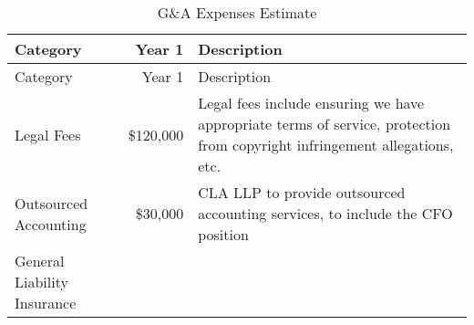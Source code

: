 \documentclass[10pt,openany]{book}
\begin{document}
\begin{longtable}[]{@{}lrl@{}}
\caption{G\&A Expenses Estimate}\tabularnewline
\toprule
\begin{minipage}[b]{0.31\columnwidth}\raggedright
Category\strut
\end{minipage} & \begin{minipage}[b]{0.12\columnwidth}\raggedleft
Year 1\strut
\end{minipage} & \begin{minipage}[b]{0.48\columnwidth}\raggedright
Description\strut
\end{minipage}\tabularnewline
\midrule
\endfirsthead
\toprule
\begin{minipage}[b]{0.31\columnwidth}\raggedright
Category\strut
\end{minipage} & \begin{minipage}[b]{0.12\columnwidth}\raggedleft
Year 1\strut
\end{minipage} & \begin{minipage}[b]{0.48\columnwidth}\raggedright
Description\strut
\end{minipage}\tabularnewline
\midrule
\endhead
\begin{minipage}[t]{0.31\columnwidth}\raggedright
Legal Fees\strut
\end{minipage} & \begin{minipage}[t]{0.12\columnwidth}\raggedleft
\$120,000\strut
\end{minipage} & \begin{minipage}[t]{0.48\columnwidth}\raggedright
Legal fees include ensuring we have appropriate terms of service,
protection from copyright infringement allegations, etc.\strut
\end{minipage}\tabularnewline
\begin{minipage}[t]{0.31\columnwidth}\raggedright
Outsourced Accounting\strut
\end{minipage} & \begin{minipage}[t]{0.12\columnwidth}\raggedleft
\$30,000\strut
\end{minipage} & \begin{minipage}[t]{0.48\columnwidth}\raggedright
CLA LLP to provide outsourced accounting services, to include the CFO
position\strut
\end{minipage}\tabularnewline
\begin{minipage}[t]{0.31\columnwidth}\raggedright
General Liability Insurance\strut
\end{minipage} & \begin{minipage}[t]{0.12\columnwidth}\raggedleft

\end{minipage}
\end{longtable}
\end{document}
